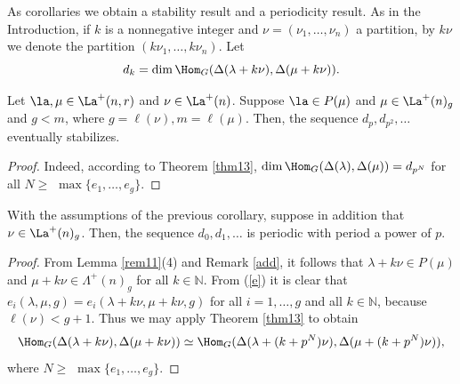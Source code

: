 	As corollaries we obtain a stability result and a periodicity result. As in the Introduction, if $k$ is a nonnegative integer and $\nu=(\nu_1,\dots,\nu_n)$ a partition, by $k\nu$ we denote the partition $(k\nu_1,\dots,k\nu_n).$ Let \begin{equation}\label{defdk}d_k=\dim \Hom _{G}(\Delta (\lambda + k \nu), \Delta(\mu + k \nu)).\end{equation}
	
\begin{coro}\label{stab} Let $\la, \mu \in \La^{+}(n,r)$ and $\nu \in \La^{+}(n)$. Suppose $\la \in P(\mu)$ and  $\mu \in \La^{+}(n)_g$ and $g<m$, where $g=\ell(\nu), m=\ell(\mu)$. Then, the sequence $d_{p}, d_{p^2}, \dots$ 
eventually stabilizes.
\end{coro}
\begin{proof} Indeed, according to Theorem \ref{thm13}, $\dim \Hom_{G}(\Delta (\lambda), \Delta(\mu)) = d_{p^N}$ for all $N \ge $ $\max\{e_1,\dots,e_g\}.$
\end{proof}		
\begin{coro}\label{per} With the assumptions of the previous corollary, suppose in addition that $\nu \in \La^{+}(n)_g$. Then, the sequence $d_0, d_1, \dots$ 
	is periodic with period a power of $p$.
\end{coro}
\begin{proof} From Lemma \ref{rem11}(4) and Remark \ref{add}, it follows that $\lambda + k \nu \in P(\mu)$ and $\mu + k \nu \in \Lambda^{+}(n)_g$ for all $k \in \mathbb{N}$. From  (\ref{e}) it is clear that $e_{i}(\lambda, \mu, g) = e_{i}(\lambda + k\nu, \mu + k\nu, g)$ for all $i=1,\dots,g$ and all $k \in \mathbb{N}$, because  $\ell(\nu) < g+1$. Thus we may apply Theorem \ref{thm13} to obtain \[\Hom_{G}(\Delta (\lambda + k \nu), \Delta(\mu + k \nu)) \simeq \Hom_{G}(\Delta (\lambda + (k+p^N) \nu), \Delta(\mu + (k+p^N) \nu)),\] where $N \ge $ $\max\{e_1,\dots,e_g\}.$
\end{proof}		
